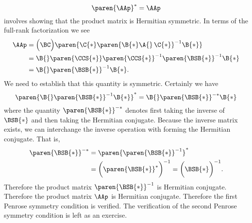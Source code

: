 \begin{equation*}
  \paren{\AAp}^{*} = \AAp
\end{equation*}
involves showing that the product matrix is Hermitian symmetric. In terms of the full-rank factorization we see
\begin{equation}
  \begin{split}
    \AAp 
      &= \Bigl(\BC \Bigr) \paren{\C{*} \paren{\B{*}\A{}\,\C{*}}^{-1} \B{*}} \\ 
      &= \B{} \paren{\CCS{*}} \paren{\CCS{*}}^{-1} \paren{\BSB{*}}^{-1} \B{*} \\
      &= \B{} \paren{\BSB{*}}^{-1} \B{*}. 
  \end{split}
\end{equation}
We need to establish that this quantity is symmetric. Certainly we have
\begin{equation}
  \paren{\B{} \paren{\BSB{*}}^{-1} \B{*}}^{*} = \B{} \paren{\BSB{*}}^{-*} \B{*}
\end{equation}
where the quantity $\paren{\BSB{*}}^{-*}$ denotes first taking the inverse of $\BSB{*}$ and then taking the Hermitian conjugate. Because the inverse matrix exists, we can interchange the inverse operation with forming the Hermitian conjugate. That is,
\begin{equation}
  \begin{split}
    \paren{\BSB{*}}^{-*} 
      &= \paren{\paren{\BSB{*}}^{-1}}^{*} \\
      &= \biggl(\paren{\BSB{*}}^{*}\biggr)^{-1}
       = \biggl(\BSB{*}\biggr)^{-1}.
  \end{split}
\end{equation}
Therefore the product matrix $\paren{\BSB{*}}^{-1}$ is Hermitian conjugate. Therefore the product matrix $\AAp$ is Hermitian conjugate. Therefore the first Penrose symmetry condition is verified. The verification of the second Penrose symmetry condition is left as an exercise.

